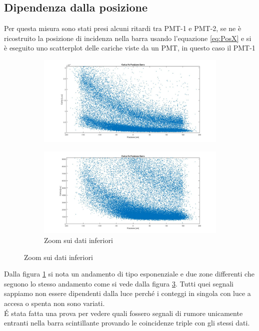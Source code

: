 \documentclass[a4paper]{article}
\begin{document}
\subsection{Dipendenza dalla posizione}
Per questa misura sono stati presi alcuni ritardi tra PMT-1 e PMT-2, se ne è ricostruito la posizione  di incidenza nella barra usando l'equazione \ref{eq:PosX} e si è eseguito uno scatterplot delle cariche viste da un PMT, in questo caso il PMT-1

\begin{figure}[H]
\begin{subfigure}[b]{0.45\textwidth}
\includegraphics[width=\textwidth]{./immagini/TimeOfFlight/AttenuazioneDoppia.jpg}
\caption{}
\label{fig:AttenuazioneDoppia}
\end{subfigure}
\begin{subfigure}[b]{0.45\textwidth}
\includegraphics[width=\textwidth]{./immagini/TimeOfFlight/AttenuazioneDoppiaZoom.jpg}
\caption{Zoom sui dati inferiori}
\label{fig:AttenuazioneDoppiaZoom}
\end{subfigure}
\end{figure}

Dalla figura \ref{fig:AttenuazioneDoppia} si nota un andamento di tipo esponenziale e due zone differenti che seguono lo stesso andamento come si vede dalla figura \ref{fig:AttenuazioneDoppiaZoom}. Tutti quei segnali sappiamo non essere dipendenti dalla luce perché i conteggi in singola con luce a accesa o spenta non sono variati.\\
\'E stata fatta una prova per vedere quali fossero segnali di rumore unicamente entranti nella barra scintillante provando le coincidenze triple con gli stessi dati.
\end{document}
